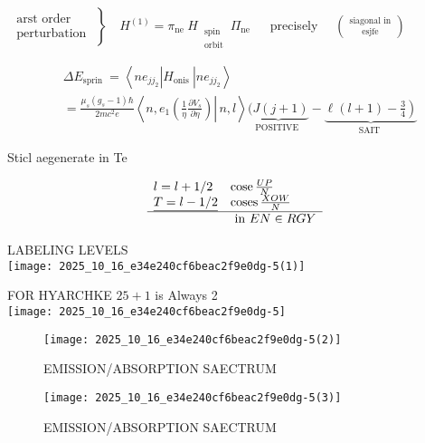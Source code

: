 $\left.\begin{array}{c}\text { arst order } \\ \text { perturbation }\end{array}\right\} \quad H^{(1)}=\pi_{\text {ne }} H_{\begin{array}{c}\text { spin } \\ \text { orbit }\end{array}} \Pi_{\text {ne }} \quad$ precisely $\quad\binom{\text { siagonal in }}{\text { esjfe }}$

$$
\begin{aligned}
& \Delta E_{\text {sprin }}=\left\langle n e_{j j_{2}}\right| H_{\text {onis }}\left|n e_{j j_{2}}\right\rangle \\
& =\frac{\mu_{s}\left(g_{s}-1\right) \hbar}{2 m c^{2} e}\left\langle n, \left.e_{1}\left(\frac{1}{\eta} \frac{\partial V_{s}}{\partial \eta}\right) \right\rvert\, n, l\right\rangle \underbrace{(J(j+1)}_{\text {POSITIVE }}-\underbrace{\left.\ell(l+1)-\frac{3}{4}\right)}_{\text {SAIT }}
\end{aligned}
$$

Sticl aegenerate in Te

$$
\begin{array}{ll}
l=l+1 / 2 & \operatorname{cose} \frac{U P}{N} \\
\underline{T=l-1 / 2} & \operatorname{coses} \frac{X O W}{N} \\
\hline & \text { in } E N \in R G Y
\end{array}
$$

LABELING LEVELS\\
\texttt{[image: 2025\_10\_16\_e34e240cf6beac2f9e0dg-5(1)]}

FOR HYARCHKE $25+1$ is Always 2\\
\texttt{[image: 2025\_10\_16\_e34e240cf6beac2f9e0dg-5]}

\begin{figure}[h]
\begin{center}
  \texttt{[image: 2025\_10\_16\_e34e240cf6beac2f9e0dg-5(2)]}
\captionsetup{labelformat=empty}
\caption{EMISSION/ABSORPTION SAECTRUM}
\end{center}
\end{figure}

\begin{figure}[h]
\begin{center}
\captionsetup{labelformat=empty}
\caption{EMISSION/ABSORPTION SAECTRUM}
  \texttt{[image: 2025\_10\_16\_e34e240cf6beac2f9e0dg-5(3)]}
\end{center}
\end{figure}

